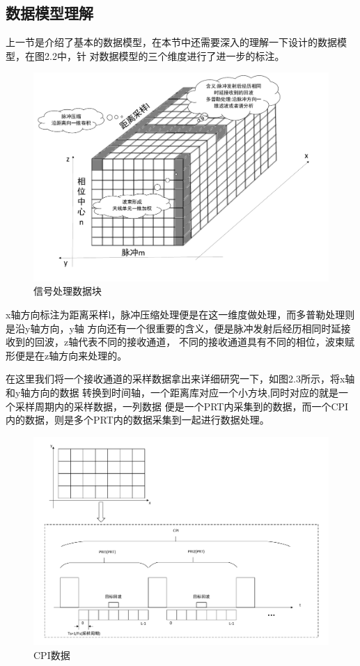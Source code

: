 \documentclass[a4paper,12pt]{report}
\begin{document}
\begin{spacing}{1.5}
\subsection{数据模型理解}
上一节是介绍了基本的数据模型，在本节中还需要深入的理解一下设计的数据模型，在图2.2中，针
对数据模型的三个维度进行了进一步的标注。
\begin{figure}[hbtp]
    \centering
    \includegraphics [width=1.0\textwidth]{figure//DataBlock2.pdf}
    \caption{信号处理数据块}\label{DataBlock2}
\end{figure}

x轴方向标注为距离采样l，脉冲压缩处理便是在这一维度做处理，而多普勒处理则是沿y轴方向，y轴
方向还有一个很重要的含义，便是脉冲发射后经历相同时延接收到的回波，z轴代表不同的接收通道，
不同的接收通道具有不同的相位，波束赋形便是在z轴方向来处理的。

在这里我们将一个接收通道的采样数据拿出来详细研究一下，如图2.3所示，将x轴和y轴方向的数据
转换到时间轴，一个距离库对应一个小方块,同时对应的就是一个采样周期内的采样数据，一列数据
便是一个PRT内采集到的数据，而一个CPI内的数据，则是多个PRT内的数据采集到一起进行数据处理。

\begin{figure}[H]
    \centering
    \includegraphics [width=1.0\textwidth]{figure//CPIdata.pdf}
    \caption{CPI数据}\label{CPIdata}
\end{figure}


\end{spacing}
\end{document}
